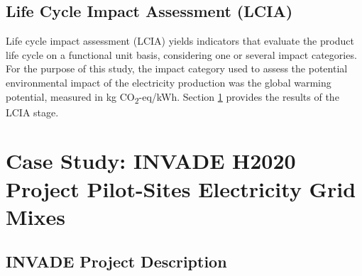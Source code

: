 {{%

{\subsection{Life Cycle Impact Assessment (LCIA)}}
{Life cycle impact assessment (LCIA) yields indicators  that evaluate the product life cycle on a functional unit basis, considering one or several impact categories. For the purpose of this study, the impact category used to assess the potential environmental impact of the electricity production was the global warming potential, measured in kg CO\textsubscript2-eq/kWh}. Section \ref{CaseStudy} provides the results of the LCIA stage.}

\section{Case Study: INVADE H2020 Project Pilot-Sites Electricity Grid Mixes} \label{CaseStudy}
\subsection{INVADE Project Description}

}
